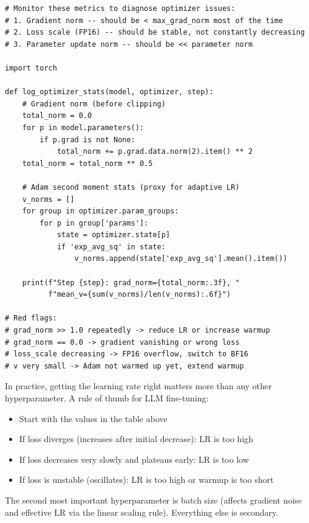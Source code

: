 \begin{examplebox}
\begin{lstlisting}[style=pythonstyle]
# Monitor these metrics to diagnose optimizer issues:
# 1. Gradient norm -- should be < max_grad_norm most of the time
# 2. Loss scale (FP16) -- should be stable, not constantly decreasing
# 3. Parameter update norm -- should be << parameter norm

import torch

def log_optimizer_stats(model, optimizer, step):
    # Gradient norm (before clipping)
    total_norm = 0.0
    for p in model.parameters():
        if p.grad is not None:
            total_norm += p.grad.data.norm(2).item() ** 2
    total_norm = total_norm ** 0.5

    # Adam second moment stats (proxy for adaptive LR)
    v_norms = []
    for group in optimizer.param_groups:
        for p in group['params']:
            state = optimizer.state[p]
            if 'exp_avg_sq' in state:
                v_norms.append(state['exp_avg_sq'].mean().item())

    print(f"Step {step}: grad_norm={total_norm:.3f}, "
          f"mean_v={sum(v_norms)/len(v_norms):.6f}")

# Red flags:
# grad_norm >> 1.0 repeatedly -> reduce LR or increase warmup
# grad_norm == 0.0 -> gradient vanishing or wrong loss
# loss_scale decreasing -> FP16 overflow, switch to BF16
# v very small -> Adam not warmed up yet, extend warmup
\end{lstlisting}
\end{examplebox}

\begin{intuitionbox}
In practice, getting the learning rate right matters more than any other hyperparameter. A rule of thumb for LLM fine-tuning:

\begin{itemize}
  \item Start with the values in the table above
  \item If loss diverges (increases after initial decrease): LR is too high
  \item If loss decreases very slowly and plateaus early: LR is too low
  \item If loss is unstable (oscillates): LR is too high or warmup is too short
\end{itemize}

The second most important hyperparameter is batch size (affects gradient noise and effective LR via the linear scaling rule). Everything else is secondary.
\end{intuitionbox}

